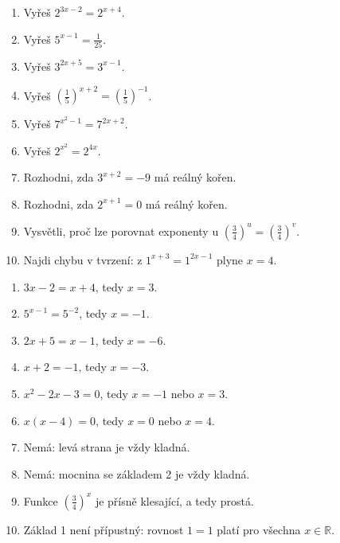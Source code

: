 \documentclass[11pt,a4paper]{article}
\begin{document}
\clearpage
\begin{zadaniReseniBox}[title={Domácí úkol}]
\begin{enumerate}[label=\alph*)]
\item Vyřeš $2^{3x-2}=2^{x+4}$.
\item Vyřeš $5^{x-1}=\frac{1}{25}$.
\item Vyřeš $3^{2x+5}=3^{x-1}$.
\item Vyřeš $\left(\frac{1}{5}\right)^{x+2}=\left(\frac{1}{5}\right)^{-1}$.
\item Vyřeš $7^{x^2-1}=7^{2x+2}$.
\item Vyřeš $2^{x^2}=2^{4x}$.
\item Rozhodni, zda $3^{x+2}=-9$ má reálný kořen.
\item Rozhodni, zda $2^{x+1}=0$ má reálný kořen.
\item Vysvětli, proč lze porovnat exponenty u $\left(\frac{3}{4}\right)^u=\left(\frac{3}{4}\right)^v$.
\item Najdi chybu v tvrzení: z $1^{x+3}=1^{2x-1}$ plyne $x=4$.
\end{enumerate}
\tcblower
\begin{enumerate}[label=\alph*)]
\item $3x-2=x+4$, tedy $x=3$.
\item $5^{x-1}=5^{-2}$, tedy $x=-1$.
\item $2x+5=x-1$, tedy $x=-6$.
\item $x+2=-1$, tedy $x=-3$.
\item $x^2-2x-3=0$, tedy $x=-1$ nebo $x=3$.
\item $x(x-4)=0$, tedy $x=0$ nebo $x=4$.
\item Nemá: levá strana je vždy kladná.
\item Nemá: mocnina se základem 2 je vždy kladná.
\item Funkce $\left(\frac{3}{4}\right)^x$ je přísně klesající, a tedy prostá.
\item Základ 1 není přípustný: rovnost $1=1$ platí pro všechna $x\in\mathbb R$.
\end{enumerate}
\end{zadaniReseniBox}
\end{document}
